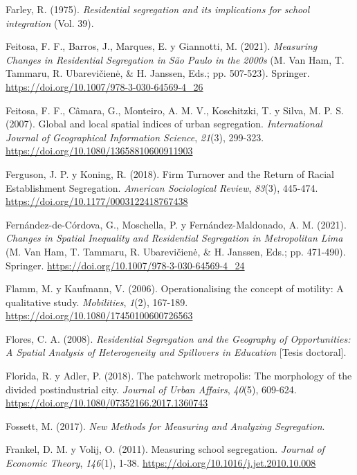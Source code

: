 \documentclass[
  spanish,
  a4paper,%
  chapterprefix=true,%
  DIV=calc,%
  twoside]{scrbook}%
\newlength{\cslhangindent}
\newenvironment{CSLReferences}[2] %
 {\begin{list}{}{%
  \setlength{\itemindent}{0pt}
  \setlength{\leftmargin}{0pt}
  \setlength{\parsep}{0pt}
  \ifodd #1
   \setlength{\leftmargin}{\cslhangindent}
   \setlength{\itemindent}{-1\cslhangindent}
  \fi
  \setlength{\itemsep}{#2\baselineskip}}}
 {\end{list}}
\begin{document}
\begin{CSLReferences}{1}{0}
Farley, R. (1975). \emph{Residential segregation and its implications for school integration} (Vol. 39).

Feitosa, F. F., Barros, J., Marques, E. y Giannotti, M. (2021). \emph{Measuring Changes in Residential Segregation in São Paulo in the 2000s} (M. Van Ham, T. Tammaru, R. Ubarevičienė, \& H. Janssen, Eds.; pp. 507-523). Springer. \url{https://doi.org/10.1007/978-3-030-64569-4_26}

Feitosa, F. F., Câmara, G., Monteiro, A. M. V., Koschitzki, T. y Silva, M. P. S. (2007). Global and local spatial indices of urban segregation. \emph{International Journal of Geographical Information Science}, \emph{21}(3), 299-323. \url{https://doi.org/10.1080/13658810600911903}

Ferguson, J. P. y Koning, R. (2018). Firm Turnover and the Return of Racial Establishment Segregation. \emph{American Sociological Review}, \emph{83}(3), 445-474. \url{https://doi.org/10.1177/0003122418767438}

Fernández-de-Córdova, G., Moschella, P. y Fernández-Maldonado, A. M. (2021). \emph{Changes in Spatial Inequality and Residential Segregation in Metropolitan Lima} (M. Van Ham, T. Tammaru, R. Ubarevičienė, \& H. Janssen, Eds.; pp. 471-490). Springer. \url{https://doi.org/10.1007/978-3-030-64569-4_24}

Flamm, M. y Kaufmann, V. (2006). Operationalising the concept of motility: A qualitative study. \emph{Mobilities}, \emph{1}(2), 167-189. \url{https://doi.org/10.1080/17450100600726563}

Flores, C. A. (2008). \emph{Residential Segregation and the Geography of Opportunities: A Spatial Analysis of Heterogeneity and Spillovers in Education} {[}Tesis doctoral{]}.

Florida, R. y Adler, P. (2018). The patchwork metropolis: The morphology of the divided postindustrial city. \emph{Journal of Urban Affairs}, \emph{40}(5), 609-624. \url{https://doi.org/10.1080/07352166.2017.1360743}

Fossett, M. (2017). \emph{New Methods for Measuring and Analyzing Segregation}.

Frankel, D. M. y Volij, O. (2011). Measuring school segregation. \emph{Journal of Economic Theory}, \emph{146}(1), 1-38. \url{https://doi.org/10.1016/j.jet.2010.10.008}


\end{CSLReferences}
\end{document}
